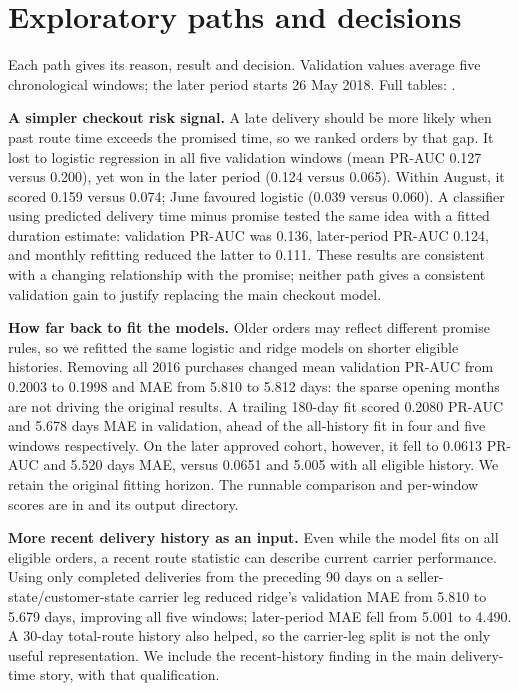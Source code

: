 \documentclass[12pt,a4paper]{article}
\begin{document}
\section{Exploratory paths and decisions}
\label{app:paths}
\footnotesize
Each path gives its reason, result and decision. Validation values average five chronological windows; the later period starts 26 May 2018. Full tables: .

\textbf{A simpler checkout risk signal.} A late delivery should be more likely when past route time exceeds the promised time, so we ranked orders by that gap. It lost to logistic regression in all five validation windows (mean PR-AUC 0.127 versus 0.200), yet won in the later period (0.124 versus 0.065). Within August, it scored 0.159 versus 0.074; June favoured logistic (0.039 versus 0.060). A classifier using predicted delivery time minus promise tested the same idea with a fitted duration estimate: validation PR-AUC was 0.136, later-period PR-AUC 0.124, and monthly refitting reduced the latter to 0.111. These results are consistent with a changing relationship with the promise; neither path gives a consistent validation gain to justify replacing the main checkout model.

\textbf{How far back to fit the models.} Older orders may reflect different promise rules, so we refitted the same logistic and ridge models on shorter eligible histories. Removing all 2016 purchases changed mean validation PR-AUC from 0.2003 to 0.1998 and MAE from 5.810 to 5.812 days: the sparse opening months are not driving the original results. A trailing 180-day fit scored 0.2080 PR-AUC and 5.678 days MAE in validation, ahead of the all-history fit in four and five windows respectively. On the later approved cohort, however, it fell to 0.0613 PR-AUC and 5.520 days MAE, versus 0.0651 and 5.005 with all eligible history. We retain the original fitting horizon. The runnable comparison and per-window scores are in  and its output directory.

\textbf{More recent delivery history as an input.} Even while the model fits on all eligible orders, a recent route statistic can describe current carrier performance. Using only completed deliveries from the preceding 90 days on a seller-state/customer-state carrier leg reduced ridge's validation MAE from 5.810 to 5.679 days, improving all five windows; later-period MAE fell from 5.001 to 4.490. A 30-day total-route history also helped, so the carrier-leg split is not the only useful representation. We include the recent-history finding in the main delivery-time story, with that qualification.
\end{document}
